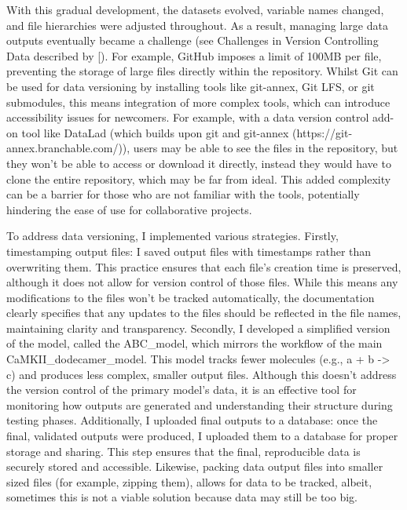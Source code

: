 \documentclass[
  11pt,
  letterpaper,
]{scrreprt}
\begin{document}
With this gradual development, the datasets evolved, variable names
changed, and file hierarchies were adjusted throughout. As a result,
managing large data outputs eventually became a challenge (see
Challenges in Version Controlling Data described by
{[}\citeproc{ref-turingwaycommunity2019TuringWayHandbook}{356}{]}). For
example, GitHub imposes a limit of 100MB per file, preventing the
storage of large files directly within the repository. Whilst Git can be
used for data versioning by installing tools like git-annex, Git LFS, or
git submodules, this means integration of more complex tools, which can
introduce accessibility issues for newcomers. For example, with a data
version control add-on tool like DataLad (which builds upon git and
git-annex (https://git-annex.branchable.com/)), users may be able to see
the files in the repository, but they won't be able to access or
download it directly, instead they would have to clone the entire
repository, which may be far from ideal. This added complexity can be a
barrier for those who are not familiar with the tools, potentially
hindering the ease of use for collaborative projects.

To address data versioning, I implemented various strategies. Firstly,
timestamping output files: I saved output files with timestamps rather
than overwriting them. This practice ensures that each file's creation
time is preserved, although it does not allow for version control of
those files. While this means any modifications to the files won't be
tracked automatically, the documentation clearly specifies that any
updates to the files should be reflected in the file names, maintaining
clarity and transparency. Secondly, I developed a simplified version of
the model, called the ABC\_model, which mirrors the workflow of the main
CaMKII\_dodecamer\_model. This model tracks fewer molecules (e.g., a + b
-\textgreater{} c) and produces less complex, smaller output files.
Although this doesn't address the version control of the primary model's
data, it is an effective tool for monitoring how outputs are generated
and understanding their structure during testing phases. Additionally, I
uploaded final outputs to a database: once the final, validated outputs
were produced, I uploaded them to a database for proper storage and
sharing. This step ensures that the final, reproducible data is securely
stored and accessible. Likewise, packing data output files into smaller
sized files (for example, zipping them), allows for data to be tracked,
albeit, sometimes this is not a viable solution because data may still
be too big.
\end{document}
